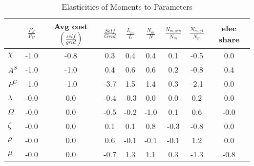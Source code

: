 \begin{table}[H] 
\center 
\renewcommand{\arraystretch}{2} 
\setlength{\tabcolsep}{3mm}
\vspace{3mm} 
\caption{Elasticities of Moments to Parameters} \label{tab:cal_matrix}
\begin{tabular}{l c c c c c c c c }\hline 
\hline 
& $\frac{P_S}{P_G}$ & Avg cost$\left(\frac{self}{grid}\right)$  & $\frac{Self}{Grid}$ & $\frac{L_m}{L}$ & $\frac{N_m}{N}$ & $\frac{N_{m,gen}}{N_m}$ & $\frac{N_{m,q1}}{N_m}$ & elec share \\ 
\hline 
  $\chi$ &     -1.0 &     -0.8 &      0.3 &      0.4 &      0.4 &      0.1 &     -0.5 &      0.0\\   $A^S$ &     -1.0 &     -1.0 &      0.4 &      0.6 &      0.6 &      0.2 &     -0.8 &      0.4\\   $P^G$ &     -1.0 &     -1.0 &     -3.7 &      1.5 &      1.4 &      0.3 &     -2.1 &      0.0\\   $\lambda$ &     -0.0 &      0.0 &     -0.4 &     -0.3 &      0.0 &      0.0 &      0.2 &      0.0\\   $\Omega$ &     -0.0 &      0.0 &     -0.5 &     -0.2 &     -1.0 &      0.1 &      0.6 &     -0.0\\   $\zeta$ &     -0.0 &      0.0 &      0.1 &      0.1 &      0.8 &     -0.3 &     -0.8 &      0.0\\   $\rho$ &     -0.0 &      0.0 &      0.6 &     -0.1 &     -0.1 &     -0.1 &      1.2 &      0.0\\   $\mu$ &     -0.0 &      0.0 &     -0.7 &      1.3 &      1.1 &      0.3 &     -1.3 &     -0.8\\ \hline 
\end{tabular}
\end{table} 
